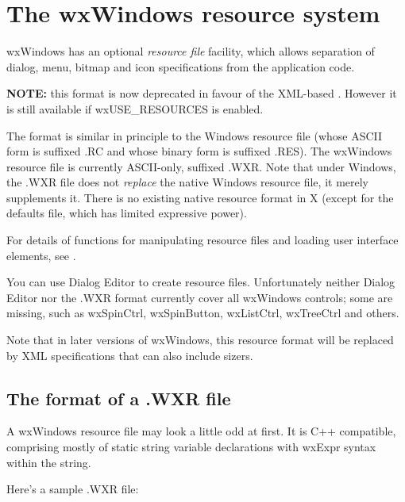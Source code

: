\section{The wxWindows resource system}\label{resourceformats}

wxWindows has an optional {\it resource file} facility,
which allows separation of dialog, menu, bitmap and icon specifications
from the application code.

{\bf NOTE:} this format is now deprecated in favour of the XML-based .
However it is still available if wxUSE\_RESOURCES is enabled.

The format is similar in principle to the Windows resource file (whose ASCII form is
suffixed .RC and whose binary form is suffixed .RES). The wxWindows resource
file is currently ASCII-only, suffixed .WXR. Note that under Windows,
the .WXR file does not {\it replace} the native Windows resource file,
it merely supplements it. There is no existing native resource format in X
(except for the defaults file, which has limited expressive power).

For details of functions for manipulating resource files and loading
user interface elements, see .

You can use Dialog Editor to create resource files. Unfortunately neither
Dialog Editor nor the .WXR format currently cover all wxWindows controls;
some are missing, such as wxSpinCtrl, wxSpinButton, wxListCtrl, wxTreeCtrl and others.

Note that in later versions of wxWindows, this resource format will be replaced
by XML specifications that can also include sizers.

\subsection{The format of a .WXR file}

A wxWindows resource file may look a little odd at first. It is C++
compatible, comprising mostly of static string variable declarations with
wxExpr syntax within the string.

Here's a sample .WXR file:

